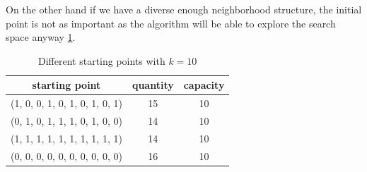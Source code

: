 On the other hand if we have a diverse enough neighborhood structure, the initial point is not as important as the algorithm will be able to explore the search space anyway \ref{tab:start}.
\begin{table}[H]
    \centering
    \begin{tabular}{c||c |c}
        starting point                 & quantity & capacity \\ \hline
        (1, 0, 0, 1, 0, 1, 0, 1, 0, 1) & 15       & 10       \\
        (0, 1, 0, 1, 1, 1, 0, 1, 0, 0) & 14       & 10       \\
        (1, 1, 1, 1, 1, 1, 1, 1, 1, 1) & 14       & 10       \\
        (0, 0, 0, 0, 0, 0, 0, 0, 0, 0) & 16       & 10       \\
    \end{tabular}
    \caption{Different starting points with $k=10$}
    \label{tab:start}
\end{table}

